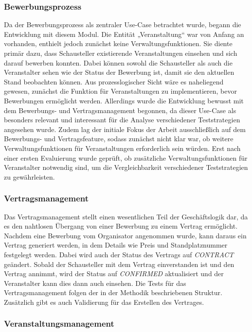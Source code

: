\subsubsection{Bewerbungsprozess}
Da der Bewerbungsprozess als zentraler Use-Case betrachtet wurde, begann die Entwicklung mit diesem Modul. Die Entität „Veranstaltung“ war von Anfang an vorhanden, enthielt jedoch zunächst keine Verwaltungsfunktionen. Sie diente primär dazu, dass Schausteller existierende Veranstaltungen einsehen und sich darauf bewerben konnten. Dabei können sowohl die Schausteller als auch die Veranstalter sehen wie der Status der Bewerbung ist, damit sie den aktuellen Stand beobachten können.
Aus prozesslogischer Sicht wäre es naheliegend gewesen, zunächst die Funktion für Veranstaltungen zu implementieren, bevor Bewerbungen ermöglicht werden. Allerdings wurde die Entwicklung bewusst mit dem Bewerbungs- und Vertragsmanagement begonnen, da dieser Use-Case als besonders relevant und interessant für die Analyse verschiedener Teststrategien angesehen wurde. Zudem lag der initiale Fokus der Arbeit ausschließlich auf dem Bewerbungs- und Vertragsfeature, sodass zunächst nicht klar war, ob weitere Verwaltungsfunktionen für Veranstaltungen erforderlich sein würden. Erst nach einer ersten Evaluierung wurde geprüft, ob zusätzliche Verwaltungsfunktionen für Veranstalter notwendig sind, um die Vergleichbarkeit verschiedener Teststrategien zu gewährleisten.

\subsubsection{Vertragsmanagement}
Das Vertragsmanagement stellt einen wesentlichen Teil der Geschäftslogik dar, da es den nahtlosen Übergang von einer Bewerbung zu einem Vertrag ermöglicht. Nachdem eine Bewerbung vom Organisator angenommen wurde, kann daraus ein Vertrag generiert werden, in dem Details wie Preis und Standplatznummer festgelegt werden. Dabei wird auch der Status des Vertrags auf \textit{CONTRACT} geändert. Sobald der Schausteller mit dem Vertrag einverstanden ist und den Vertrag annimmt, wird der Status auf \textit{CONFIRMED} aktualisiert und  der Veranstalter kann dies dann auch einsehen.
Die Tests für das Vertragsmanagement folgen der in der Methodik beschriebenen Struktur. Zusätzlich gibt es auch Validierung für das Erstellen des Vertrages.
\subsubsection{Veranstaltungsmanagement}

